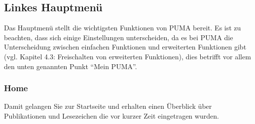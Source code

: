 \subsection{Linkes Hauptmenü}
Das Hauptmenü stellt die wichtigsten Funktionen von PUMA bereit. Es ist zu beachten, dass sich einige Einstellungen unterscheiden, da es bei PUMA die Unterscheidung zwischen einfachen Funktionen und erweiterten Funktionen gibt (vgl. Kapitel 4.3: Freischalten von erweiterten Funktionen), dies betrifft vor allem den unten genannten Punkt \enquote{Mein PUMA}. 
\subsubsection{Home}
Damit gelangen Sie zur Startseite und erhalten einen Überblick über Publikationen und Lesezeichen die vor kurzer Zeit eingetragen wurden.
